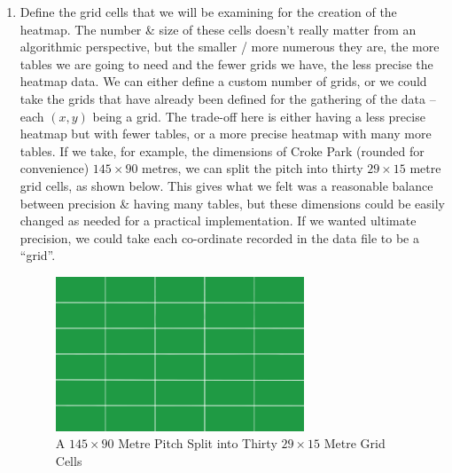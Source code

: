 \documentclass[a4paper,11pt]{article}
\begin{document}
\begin{enumerate}
    \item   Define the grid cells that we will be examining for the creation of the heatmap. 
            The number \& size of these cells doesn't really matter from an algorithmic perspective, but the smaller / more numerous they are, the more tables we are going to need and the fewer grids we have, the less precise the heatmap data.
            We can either define a custom number of grids, or we could take the grids that have already been defined for the gathering of the data -- each $(x,y)$ being a grid. 
            The trade-off here is either having a less precise heatmap but with fewer tables, or a more precise heatmap with many more tables.
            If we take, for example, the dimensions of Croke Park (rounded for convenience) $145 \times 90$ metres, we can split the pitch into thirty $29 \times 15$ metre grid cells, as shown below.
            This gives what we felt was a reasonable balance between precision \& having many tables, but  these dimensions could be easily changed as needed for a practical implementation. 
            If we wanted ultimate precision, we could take each co-ordinate recorded in the data file to be a ``grid''.
            \begin{figure}[H]
                \centering
                \includegraphics[width=0.7\textwidth]{./pitch.png}
                \caption{A $145 \times 90$ Metre Pitch Split into Thirty $29 \times 15$ Metre Grid Cells}
            \end{figure}
            

\end{enumerate}
\end{document}
